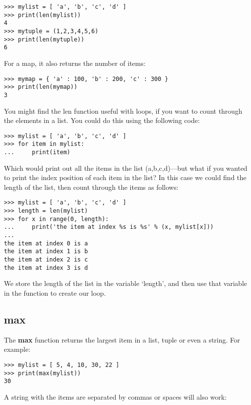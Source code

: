 \begin{Verbatim}[frame=single]
>>> mylist = [ 'a', 'b', 'c', 'd' ]
>>> print(len(mylist))
4
>>> mytuple = (1,2,3,4,5,6)
>>> print(len(mytuple))
6
\end{Verbatim}

\noindent
For a map, it also returns the number of items:

\begin{Verbatim}[frame=single]
>>> mymap = { 'a' : 100, 'b' : 200, 'c' : 300 }
>>> print(len(mymap))
3
\end{Verbatim}

\noindent
You might find the len function useful with loops, if you want to count through the elements in a list.  You could do this using the following code:

\begin{Verbatim}[frame=single]
>>> mylist = [ 'a', 'b', 'c', 'd' ]
>>> for item in mylist:
...     print(item)
\end{Verbatim}

\noindent
Which would print out all the items in the list (a,b,c,d)---but what if you wanted to print the index position of each item in the list?  In this case we could find the length of the list, then count through the items as follows:

\begin{Verbatim}[frame=single]
>>> mylist = [ 'a', 'b', 'c', 'd' ]
>>> length = len(mylist)
>>> for x in range(0, length):
...     print('the item at index %s is %s' % (x, mylist[x]))
...
the item at index 0 is a
the item at index 1 is b
the item at index 2 is c
the item at index 3 is d
\end{Verbatim}

\noindent
We store the length of the list in the variable `length', and then use that variable in the  function to create our loop.

\subsection*{max}

The \textbf{max} function returns the largest item in a list, tuple or even a string. For example:

\begin{Verbatim}[frame=single]
>>> mylist = [ 5, 4, 10, 30, 22 ]
>>> print(max(mylist))
30
\end{Verbatim}

\noindent
A string with the items are separated by commas or spaces will also work:

